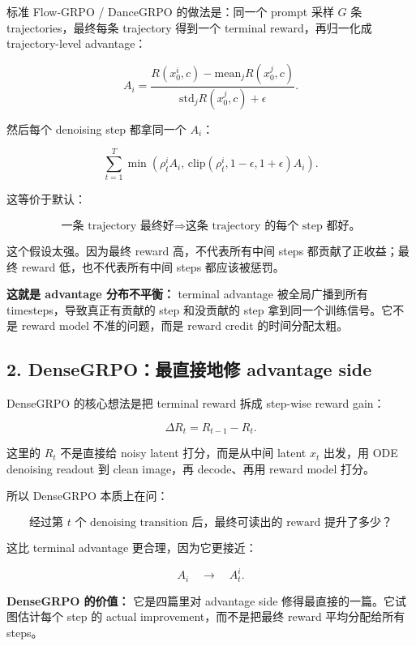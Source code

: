 标准 Flow-GRPO / DanceGRPO 的做法是：同一个 prompt 采样 \(G\) 条 trajectories，最终每条 trajectory 得到一个 terminal reward，再归一化成 trajectory-level advantage：

\[
A_i
=
\frac{
R(x_0^i,c)-\mathrm{mean}_{j}R(x_0^j,c)
}{
\mathrm{std}_{j}R(x_0^j,c)+\epsilon
}.
\]

然后每个 denoising step 都拿同一个 \(A_i\)：

\[
\sum_{t=1}^{T}
\min
\left(
\rho_t^i A_i,\,
\mathrm{clip}(\rho_t^i,1-\epsilon,1+\epsilon)A_i
\right).
\]

这等价于默认：

\[
\text{一条 trajectory 最终好}
\Rightarrow
\text{这条 trajectory 的每个 step 都好。}
\]

这个假设太强。因为最终 reward 高，不代表所有中间 steps 都贡献了正收益；最终 reward 低，也不代表所有中间 steps 都应该被惩罚。

\begin{warnbox}
\textbf{这就是 advantage 分布不平衡：} terminal advantage 被全局广播到所有 timesteps，导致真正有贡献的 step 和没贡献的 step 拿到同一个训练信号。它不是 reward model 不准的问题，而是 reward credit 的时间分配太粗。
\end{warnbox}

\subsection{2. DenseGRPO：最直接地修 advantage side}

DenseGRPO 的核心想法是把 terminal reward 拆成 step-wise reward gain：

\[
\Delta R_t
=
R_{t-1}-R_t.
\]

这里的 \(R_t\) 不是直接给 noisy latent 打分，而是从中间 latent \(x_t\) 出发，用 ODE denoising readout 到 clean image，再 decode、再用 reward model 打分。

所以 DenseGRPO 本质上在问：

\[
\text{经过第 \(t\) 个 denoising transition 后，最终可读出的 reward 提升了多少？}
\]

这比 terminal advantage 更合理，因为它更接近：

\[
A_i
\quad \rightarrow \quad
A_t^i.
\]

\begin{summarybox}
\textbf{DenseGRPO 的价值：} 它是四篇里对 advantage side 修得最直接的一篇。它试图估计每个 step 的 actual improvement，而不是把最终 reward 平均分配给所有 steps。
\end{summarybox}

